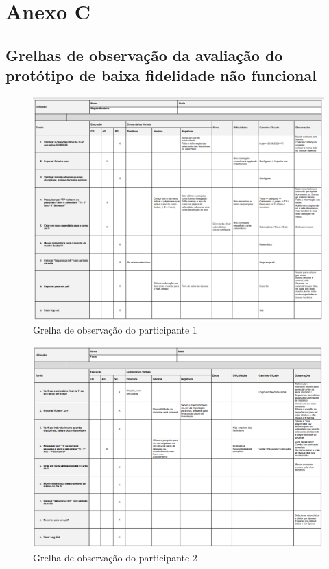 \documentclass[11pt, twoside]{report}
\begin{document}
	
	\chapter*{Anexo C}
	\section*{Grelhas de observação da avaliação do protótipo de baixa fidelidade não funcional}
		\begin{landscape}
		\clearpage
			\pagestyle{empty}
			\begin{figure}[H] 
				\centering 							\includegraphics[width=1.23\textwidth,height=1.23\textheight,keepaspectratio]{image/testes_prototipo_baixo_fidelidade/grelha_observadores_magda}
				\caption{Grelha de observação do participante 1}
				
			\end{figure}
			\begin{figure}[H] 
				\centering 							\includegraphics[width=1.4\textwidth,height=1.4\textheight,keepaspectratio]{image/testes_prototipo_baixo_fidelidade/grelha_observadores_paulo}
				\caption{Grelha de observação do participante 2}
				
			\end{figure}
		\end{landscape}
\end{document}
